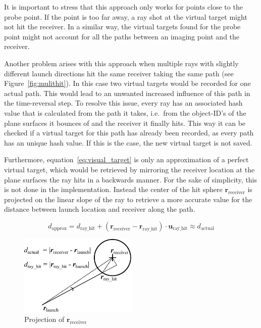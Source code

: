It is important to stress that this approach only works for points close to the probe point.
If the point is too far away, a ray shot at the virtual target might not hit the receiver.
In a similar way, the virtual targets found for the probe point might not account for all the paths between an imaging point and the receiver.

Another problem arises with this approach when multiple rays with slightly different launch directions hit the same receiver taking the same path (see Figure~\ref{fig:mulithit}).
In this case two virtual targets would be recorded for one actual path.
This would lead to an unwanted increased influence of this path in the time-reversal step.
To resolve this issue, every ray has an associated hash value that is calculated from the path it takes, i.e.~from the object-ID's of the plane surfaces it bounces of and the receiver it finally hits.
This way it can be checked if a virtual target for this path has already been recorded, as every path has an unique hash value.
If this is the case, the new virtual target is not saved.

Furthermore, equation~\eqref{eq:visual_target} is only an approximation of a perfect virtual target, which would be retrieved by mirroring the receiver location at the plane surfaces the ray hits in a backwards manner.
For the sake of simplicity, this is not done in the implementation.
Instead the center of the hit sphere \(\bm{r}_{\text{receiver}}\) is projected on the linear slope of the ray to retrieve a more accurate value for the distance between launch location and receiver along the path.

\begin{equation}
    d_{\text{approx}} = d_{\text{ray\_hit}} +  (\bm{r}_{\text{receiver}} - \bm{r}_{\text{ray\_hit}}) \cdot \bm{u}_{\text{ray\_hit}} \approx d_{\text{actual}}
\end{equation}

\begin{figure}[h]
    \centering
    \includegraphics[width=0.5\textwidth]{figures/d_approx.pdf}
    \caption{Projection of \(\bm{r}_{\text{receiver}}\)}\label{fig:d_approx}
\end{figure}


